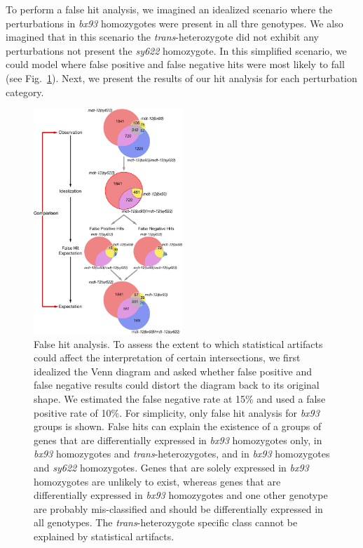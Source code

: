 \documentclass[10pt, twocolumn]{article}
\begin{document}
To perform a false hit analysis, we imagined an idealized scenario where the
perturbations in \emph{bx93} homozygotes were present in all thre genotypes. We
also imagined that in this scenario the \emph{trans}-heterozygote did not exhibit
any perturbations not present the \emph{sy622} homozygote. In this simplified
scenario, we could model where false positive and false negative hits were most
likely to fall (see Fig.~\ref{fig:false_hit}). Next, we present the results of
our hit analysis for each perturbation category.

\begin{figure}
  \includegraphics[width=0.5\textwidth]{../figs/false_hit_analysis.pdf}
  \caption{False hit analysis. To assess the extent to which statistical
  artifacts could affect the interpretation of certain intersections, we
  first idealized the Venn diagram and asked whether false positive and
  false negative results could distort the diagram back to its original
  shape. We estimated the false negative rate at 15\% and used a false positive
  rate of 10\%. For simplicity, only false hit analysis for \emph{bx93} groups
  is shown. False hits can explain the existence of a groups of genes that
  are differentially expressed in \emph{bx93} homozygotes only, in \emph{bx93}
  homozygotes and \emph{trans}-heterozygotes, and in \emph{bx93} homozygotes
  and \emph{sy622} homozygotes. Genes that are solely expressed in \emph{bx93}
  homozygotes are unlikely to exist, whereas genes that are differentially
  expressed in \emph{bx93} homozygotes and one other genotype are probably
  mis-classified and should be differentially expressed in all genotypes. The
  \emph{trans}-heterozygote specific class cannot be explained by statistical
  artifacts.
  }
\label{fig:false_hit}
\end{figure}
\end{document}
